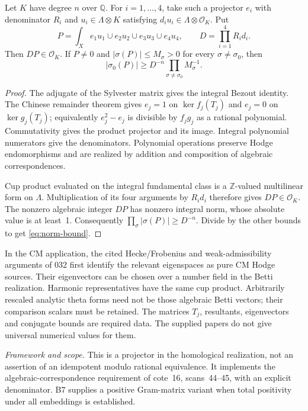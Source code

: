 \documentclass[11pt]{article}
\newcommand{\Q}{\mathbb Q}\newcommand{\C}{\mathbb C}\newcommand{\Z}{\mathbb Z}\newcommand{\R}{\mathbb R}\newcommand{\A}{\mathbb A}\newcommand{\OO}{\mathcal O}
\newcommand{\framework}[1]{\par\smallskip\noindent\textit{Framework and scope.} #1\par}
\theoremstyle{definition}\newtheorem{definition}[theorem]{Definition}\newtheorem{remark}[theorem]{Remark}
\begin{document}
Let $K$ have degree $n$ over $\Q$. For $i=1,\ldots,4$, take such a projector $e_i$ with denominator $R_i$ and $u_i\in\Lambda\otimes K$ satisfying
$d_i u_i\in\Lambda\otimes\OO_K$. Put
\[
 P=\int_X e_1u_1\cup e_2u_2\cup e_3u_3\cup e_4u_4,
 \qquad D=\prod_{i=1}^4R_i d_i.
\]
Then $DP\in\OO_K$. If $P\ne0$ and
$|\sigma(P)|\leq M_\sigma>0$ for every $\sigma\ne\sigma_0$, then
\begin{equation}\label{eq:norm-bound}
 |\sigma_0(P)|\geq D^{-n}\prod_{\sigma\ne\sigma_0}M_\sigma^{-1}.
\end{equation}
\begin{proof}
The adjugate of the Sylvester matrix gives the integral Bezout identity. The Chinese remainder theorem gives $e_j=1$ on $\ker f_j(T_j)$ and $e_j=0$ on $\ker g_j(T_j)$; equivalently $e_j^2-e_j$ is divisible by $f_jg_j$ as a rational polynomial. Commutativity gives the product projector and its image. Integral polynomial numerators give the denominators. Polynomial operations preserve Hodge endomorphisms and are realized by addition and composition of algebraic correspondences.

Cup product evaluated on the integral fundamental class is a $\Z$-valued multilinear form on $\Lambda$. Multiplication of its four arguments by $R_i d_i$ therefore gives $DP\in\OO_K$. The nonzero algebraic integer $DP$ has nonzero integral norm, whose absolute value is at least~1. Consequently
$\prod_\sigma|\sigma(P)|\geq D^{-n}$. Divide by the other bounds to get \eqref{eq:norm-bound}.
\end{proof}
In the CM application, the cited Hecke/Frobenius and weak-admissibility arguments of 032 first identify the relevant eigenspaces as pure CM Hodge sources. Their eigenvectors can be chosen over a number field in the Betti realization. Harmonic representatives have the same cup product. Arbitrarily rescaled analytic theta forms need not be those algebraic Betti vectors; their comparison scalars must be retained. The matrices $T_j$, resultants, eigenvectors and conjugate bounds are required data. The supplied papers do not give universal numerical values for them.
\framework{This is a projector in the homological realization, not an assertion of an idempotent modulo rational equivalence. It implements the algebraic-correspondence requirement of cote~16, scans~44--45, with an explicit denominator. B7 supplies a positive Gram-matrix variant when total positivity under all embeddings is established.}


\end{document}
